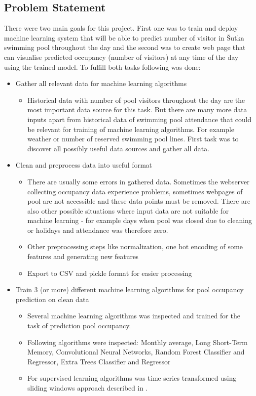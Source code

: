 \documentclass{article}
\begin{document}
\subsection{Problem Statement} \label{sec:problem_statement}

There were two main goals for this project. First one was to train and deploy machine learning system that will be able to predict number of visitor in \v{S}utka swimming pool throughout the day and the second was to create web page that can visualise predicted occupancy (number of visitors) at any time of the day using the trained model. To fulfill both tasks following was done:

\begin{itemize}
\item Gather all relevant data for machine learning algorithms
\begin{itemize}
\item Historical data with number of pool visitors throughout the day are the most important data source for this task. But there are many more data inputs apart from historical data of swimming pool attendance that could be relevant for training of machine learning algorithms. For example weather or number of reserved swimming pool lines. First task was to discover all possibly useful data sources and gather all data.
\end{itemize}

\item Clean and preprocess data into useful format
\begin{itemize}
\item There are usually some errors in gathered data. Sometimes the webserver collecting occupancy data experience problems, sometimes webpages of pool are not accessible and these data points must be removed. There are also other possible situations where input data are not suitable for machine learning - for example days when pool was closed due to cleaning or holidays and attendance was therefore zero. 
\item Other preprocessing steps like normalization, one hot encoding of some features and generating new features
\item Export to CSV and pickle format for easier processing
\end{itemize}

\item Train 3 (or more) different machine learning algorithms for pool occupancy prediction on clean data
\begin{itemize}
\item Several machine learning algorithms was inspected and trained for the task of prediction pool occupancy. 
\item Following algorithms were inspected: Monthly average, Long Short-Term Memory, Convolutional Neural Networks, Random Forest Classifier and Regressor, Extra Trees Classifier and Regressor
\item For supervised learning algorithms was time series transformed using sliding windows approach described in \citep{brownlee2019howtosupervised}.
\end{itemize}


\end{itemize}
\end{document}
